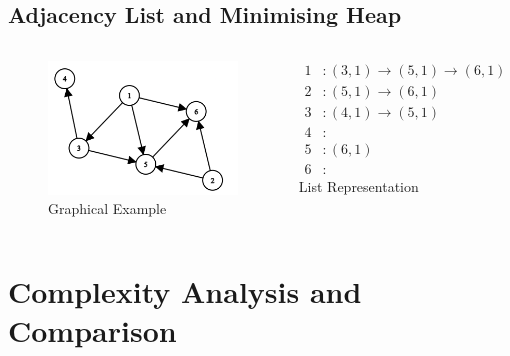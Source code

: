 \documentclass{beamer}
\begin{document}
\subsection{Adjacency List and Minimising Heap}
\begin{frame}
	\begin{columns}
	\begin{figure}
		\includegraphics[scale=0.5]{./pict/exampleGraph.png}
		\caption{Graphical Example}
	\end{figure}

	\begin{align*}
		1 &: (3, 1) \rightarrow (5, 1) \rightarrow (6, 1)\\
		2 &: (5, 1) \rightarrow (6, 1) \\
		3 &: (4, 1) \rightarrow (5, 1) \\
		4 &: \\
		5 &: (6, 1)\\
		6 &: 
	\end{align*}			
	\centering List Representation
		
	\end{columns}
\end{frame}


\section{Complexity Analysis and Comparison}
\begin{frame}
	
\end{frame}
\end{document}
